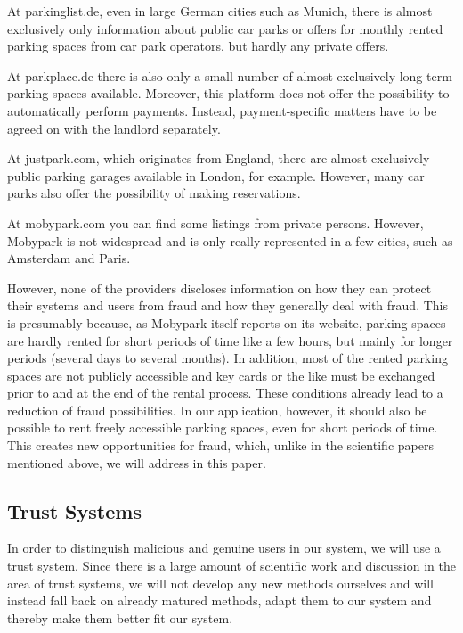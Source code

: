 \documentclass[
a4paper,     %
titlepage,   %
14pt         %
]{scrartcl}  %
\theoremstyle{mystyle}
\begin{document}
At parkinglist.de, even in large German cities such as Munich, there is almost exclusively only information about public car parks or offers for monthly rented parking spaces from car park operators, but hardly any private offers.

At parkplace.de there is also only a small number of almost exclusively long-term parking spaces available. Moreover, this platform does not offer the possibility to automatically perform payments. Instead, payment-specific matters have to be agreed on with the landlord separately.

At justpark.com, which originates from England, there are almost exclusively public parking garages available in London, for example. However, many car parks also offer the possibility of making reservations.

At mobypark.com you can find some listings from private persons. However, Mobypark is not widespread and is only really represented in a few cities, such as Amsterdam and Paris.

However, none of the providers discloses information on how they can protect their systems and users from fraud and how they generally deal with fraud. This is presumably because, as Mobypark itself reports on its website, parking spaces are hardly rented for short periods of time like a few hours, but mainly for longer periods (several days to several months). In addition, most of the rented parking spaces are not publicly accessible and key cards or the like must be exchanged prior to and at the end of the rental process. These conditions already lead to a reduction of fraud possibilities. In our application, however, it should also be possible to rent freely accessible parking spaces, even for short periods of time. This creates new opportunities for fraud, which, unlike in the scientific papers mentioned above, we will address in this paper.

\subsection{Trust Systems}
In order to distinguish malicious and genuine users in our system, we will use a trust system. Since there is a large amount of scientific work and discussion in the area of trust systems, we will not develop any new methods ourselves and will instead fall back on already matured methods, adapt them to our system and thereby make them better fit our system.\\
\end{document}
